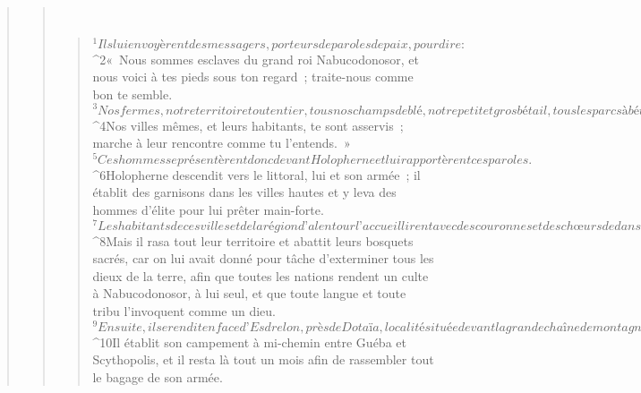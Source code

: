 \begin{verse}
\begin{verse}
         
      \bchapter{}
      \begin{verse}
${}^{1}Ils lui envoyèrent des messagers, porteurs de paroles de paix, pour dire : 
${}^{2}« Nous sommes esclaves du grand roi Nabucodonosor, et nous voici à tes pieds sous ton regard ; traite-nous comme bon te semble. 
${}^{3}Nos fermes, notre territoire tout entier, tous nos champs de blé, notre petit et gros bétail, tous les parcs à bétail de nos campements sont à ta disposition. Utilise-les comme il te plaira. 
${}^{4}Nos villes mêmes, et leurs habitants, te sont asservis ; marche à leur rencontre comme tu l’entends. » 
${}^{5}Ces hommes se présentèrent donc devant Holopherne et lui rapportèrent ces paroles.
${}^{6}Holopherne descendit vers le littoral, lui et son armée ; il établit des garnisons dans les villes hautes et y leva des hommes d’élite pour lui prêter main-forte. 
${}^{7}Les habitants de ces villes et de la région d’alentour l’accueillirent avec des couronnes et des chœurs de danse, au son des tambourins. 
${}^{8}Mais il rasa tout leur territoire et abattit leurs bosquets sacrés, car on lui avait donné pour tâche d’exterminer tous les dieux de la terre, afin que toutes les nations rendent un culte à Nabucodonosor, à lui seul, et que toute langue et toute tribu l’invoquent comme un dieu.
${}^{9}Ensuite, il se rendit en face d’Esdrelon, près de Dotaïa, localité située devant la grande chaîne de montagnes de Judée. 
${}^{10}Il établit son campement à mi-chemin entre Guéba et Scythopolis, et il resta là tout un mois afin de rassembler tout le bagage de son armée.
      

\end{verse}
\end{verse}
\end{verse}
